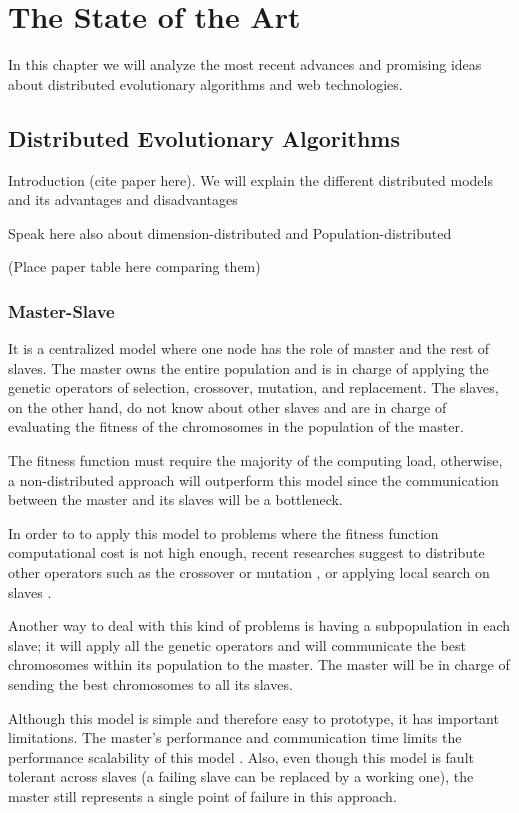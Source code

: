 \chapter{The State of the Art}
In this chapter we will analyze the most recent advances and promising ideas about distributed evolutionary algorithms and web technologies.

\section{Distributed Evolutionary Algorithms}
Introduction (cite paper here). We will explain the different distributed models and its advantages and disadvantages

Speak here also about dimension-distributed and Population-distributed 

(Place paper table here comparing them)

\subsection{Master-Slave}

It is a centralized model where one node has the role of master and the rest of slaves.
The master owns the entire population and is in charge of applying the genetic operators of selection, crossover, mutation, and replacement. The slaves, on the other hand, do not know about other slaves and are in charge of evaluating the fitness of the chromosomes in the population of the master.

The fitness function must require the majority of the computing load, otherwise, a non-distributed approach will outperform this model since the communication between the master and its slaves will be a bottleneck. 

In order to to apply this model to problems where the fitness function computational cost is not high enough, recent researches suggest to distribute other operators such as the crossover or mutation \cite{ismail}, or applying local search on slaves \cite{zhang2}. 

Another way to deal with this kind of problems is having a subpopulation in each slave; it will apply all the genetic operators and will communicate the best chromosomes within its population to the master. The master will be in charge of sending the best chromosomes to all its slaves.\cite{zhang1}

Although this model is simple and therefore easy to prototype, it has important limitations. The master's performance and communication time limits the performance scalability of this model \cite{erick}. Also, even though this model is fault tolerant across slaves (a failing slave can be replaced by a working one), the master still represents a single point of failure in this approach.

